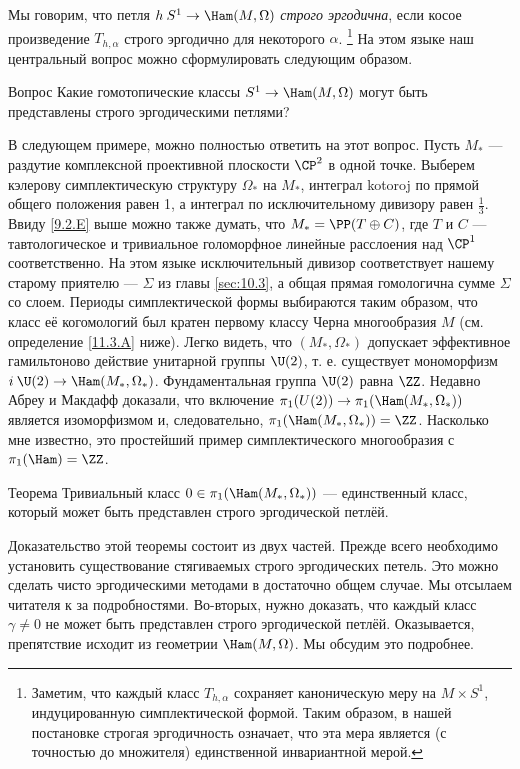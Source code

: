 Мы говорим, что петля $h\: S^1 \to \Ham(M, \Omega)$ \emph{строго эргодична}, если косое произведение $T_{h,\alpha}$ строго эргодично для некоторого $\alpha$.%
\footnote{Заметим, что каждый класс $T_{h,\alpha}$ сохраняет каноническую меру на $M \times S^1$, индуцированную симплектической формой.
Таким образом, в нашей постановке строгая эргодичность означает, что эта мера является (с точностью до множителя) единственной инвариантной мерой.}
На этом языке наш центральный вопрос можно сформулировать следующим образом.

\begin{ex*}{Вопрос}
Какие гомотопические классы $S^1 \to \Ham(M, \Omega)$ могут быть представлены строго эргодическими петлями?
\end{ex*}

В следующем примере, можно полностью ответить на этот вопрос.
Пусть $M_\ast$ --- раздутие комплексной проективной плоскости $\CP^2$ в одной точке.
Выберем кэлерову симплектическую структуру $\Omega_\ast$ на $M_\ast$,
интеграл kotoroj по прямой общего положения равен 1, а интеграл по
исключительному дивизору равен $\tfrac13$. 
Ввиду \ref{9.2.E} выше можно также думать, что $M_\ast = \PP(T \oplus
C)$, где $T$ и $C$ --- тавтологическое и тривиальное голоморфное
линейные расслоения над $\CP^1$ соответственно. 
На этом языке исключительный дивизор соответствует нашему старому
приятелю --- $\Sigma$ из главы \ref{sec:10.3}, а общая прямая гомологична
сумме $\Sigma$ со слоем. 
Периоды симплектической формы выбираются таким образом, что класс её когомологий был кратен первому классу Черна многообразия $M$ (см. определение \ref{11.3.A} ниже).
Легко видеть, что $(M_\ast, \Omega_\ast)$ допускает эффективное гамильтоново действие унитарной группы $\U(2)$, т. е. существует мономорфизм $i\: \U(2) \to \Ham(M_\ast, \Omega_\ast)$.
Фундаментальная группа $\U(2)$ равна $\ZZ$.
Недавно Абреу и Макдафф \cite{AM} доказали, что включение $\pi_1(U(2)) \to \pi_1 (\Ham(M_\ast, \Omega_\ast))$ является изоморфизмом и, следовательно, $\pi_1(\Ham(M_\ast, \Omega_\ast)) = \ZZ$.
Насколько мне известно, это простейший пример симплектического многообразия с $\pi_1 (\Ham) = \ZZ$.

\begin{thm}{Теорема}\label{11.1.A}
Тривиальный класс $0\in\pi_1(\Ham(M_\ast, \Omega_\ast))$ --- единственный класс, который может быть представлен строго эргодической петлёй.
\end{thm}

Доказательство этой теоремы состоит из двух частей.
Прежде всего необходимо установить существование стягиваемых строго эргодических петель.
Это можно сделать чисто эргодическими методами в достаточно общем случае.
Мы отсылаем читателя к \cite{P9} за подробностями.
Во-вторых, нужно доказать, что каждый класс $\gamma \ne 0$ не может быть представлен строго эргодической петлёй.
Оказывается, препятствие исходит из геометрии $\Ham(M, \Omega)$.
Мы обсудим это подробнее.


